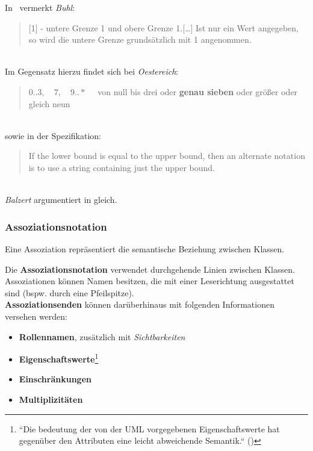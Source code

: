 \begin{tcolorbox}[title=Nur ein Wert $n > 1$ bei der Multiplizität,colback=red!20]
    In~\cite[19]{Buh09} vermerkt \textit{Buhl}:
    \blockquote{
    [1] - untere Grenze 1 und obere Grenze 1.[\ldots] Ist nur ein Wert angegeben, so wird die untere Grenze grundsätzlich mit 1 angenommen.
    }\\

    \noindent
    Im Gegensatz hierzu findet sich bei \textit{Oestereich}:\\
    \blockquote[{\cite[274, Hervorhebung eigene]{Oes05}}]{
        $0..3,\quad 7,\quad 9..*\quad$ von null bis drei oder \textbf{genau sieben} oder größer oder gleich neun
    }\\
    sowie in der Spezifikation:\\
    \blockquote[{\cite[35]{OMG17}}]{
        If the lower bound is equal to the upper bound, then an alternate notation is to use a string containing just the upper
        bound.
    }\\
    \textit{Balzert} argumentiert in \cite[43]{Bal05} gleich.
\end{tcolorbox}

\subsubsection*{Assoziationsnotation}

\begin{tcolorbox}
    Eine Assoziation repräsentiert die semantische Beziehung zwischen Klassen.
\end{tcolorbox}

\noindent
Die \textbf{Assoziationsnotation} verwendet durchgehende Linien zwischen Klassen.\\

\noindent
Assoziationen können Namen besitzen, die mit einer Leserichtung ausgestattet sind (bspw. durch eine Pfeilspitze).\\

\noindent
\textbf{Assoziationsenden} können darüberhinaus mit folgenden Informationen versehen werden:

\begin{itemize}
    \item \textbf{Rollennamen}, zusätzlich mit \textit{Sichtbarkeiten}
    \item \textbf{Eigenschaftswerte}\footnote{
    ``Die bedeutung der von der UML vorgegebenen Eigenschaftswerte hat gegenüber den Attributen eine leicht abweichende Semantik.`` (\cite[20]{Buh09})
    }
    \item \textbf{Einschränkungen}
    \item \textbf{Multiplizitäten}
\end{itemize}

